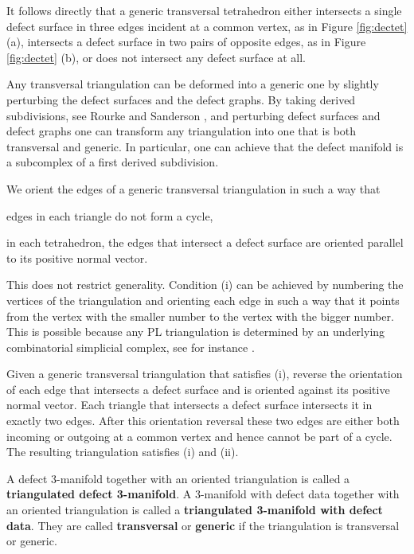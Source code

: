 \documentclass[1.5pt, a4paper]{article}
\begin{document}
It follows directly that a generic transversal tetrahedron either  intersects a single defect surface in three edges incident at a common vertex, as in Figure \ref{fig:dectet} (a), 
 intersects a defect surface in two pairs of opposite edges, as  in Figure \ref{fig:dectet} (b), or 
does not  intersect any defect surface at all.

Any transversal triangulation can be deformed into a generic one by slightly perturbing the defect surfaces and 
the defect graphs. By taking  derived subdivisions, see Rourke and Sanderson \cite[Ch.~2]{RS}, and perturbing  defect surfaces and defect graphs one can transform any triangulation into one that is both transversal and generic.  In particular,  one can achieve that the defect manifold is  a subcomplex of  a first derived subdivision.  



We orient the edges of a generic transversal triangulation in such a way that 
\begin{compactenum}[(i)]
\item   edges in each triangle do not form a cycle,
\item  in each tetrahedron, the edges that intersect a defect surface are  oriented parallel to its positive normal vector.
\end{compactenum}
This does not restrict generality.  Condition (i) can be achieved by numbering the vertices of the triangulation and orienting each edge in such a way that it points from the vertex with the smaller number to the vertex with the bigger number. This is possible because any PL triangulation is determined by an underlying combinatorial simplicial complex, see for instance 
\cite[Th.~2.11]{RS}. 





Given a generic transversal  triangulation that satisfies (i),  reverse the orientation of each edge that intersects a defect surface and is oriented against its positive normal vector.  Each triangle that intersects a defect surface intersects it in exactly two edges.  After this orientation reversal these two edges are  either both incoming or  outgoing at a common vertex and hence cannot be part of a cycle.  The resulting triangulation satisfies (i) and (ii). 


A defect 3-manifold  together with an oriented triangulation is called a {\bf  triangulated defect 3-manifold}. A 3-manifold with defect data together with an oriented triangulation is called a {\bf triangulated 3-manifold with defect data}.
They are called {\bf transversal} or {\bf generic} if the triangulation is transversal or generic. 
\end{document}
